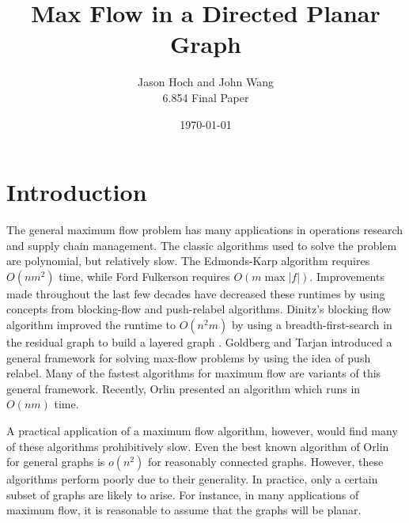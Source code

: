 \documentclass[12pt]{article}
\title{Max Flow in a Directed Planar Graph}
\date{\today}
\author{Jason Hoch and John Wang \\
6.854 Final Paper}
\begin{document}
\maketitle


\tableofcontents

\newpage

\section{Introduction}

The general maximum flow problem has many applications in operations research and supply chain management. The classic algorithms used to solve the problem are polynomial, but relatively slow. The Edmonds-Karp algorithm requires $O(n m^2)$ time, while Ford Fulkerson requires $O(m \max |f|)$. Improvements made throughout the last few decades have decreased these runtimes by using concepts from blocking-flow and push-relabel algorithms. Dinitz's blocking flow algorithm improved the runtime to $O(n^2 m)$ by using a breadth-first-search in the residual graph to build a layered graph \cite{dinitz1970}. Goldberg and Tarjan \cite{goldbergtarjan1986} introduced a general framework for solving max-flow problems by using the idea of push relabel. Many of the fastest algorithms for maximum flow are variants of this general framework. Recently, Orlin presented an algorithm which runs in $O(nm)$ time. 

A practical application of a maximum flow algorithm, however, would find many of these algorithms prohibitively slow. Even the best known algorithm of Orlin for general graphs is $o(n^2)$ for reasonably connected graphs. However, these algorithms perform poorly due to their generality. In practice, only a certain subset of graphs are likely to arise. For instance, in many applications of maximum flow, it is reasonable to assume that the graphs will be planar. 
\end{document}
